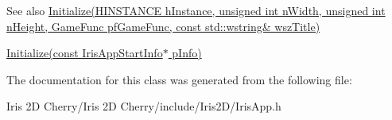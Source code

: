 \begin{DoxySeeAlso}{See also}
\hyperlink{class_iris2_d_1_1_iris_application_a84f3ddebb3a3ffb0c172bd41fb952e1a}{Initialize(\+H\+I\+N\+S\+T\+A\+N\+C\+E h\+Instance, unsigned int n\+Width, unsigned int n\+Height, Game\+Func pf\+Game\+Func, const std\+::wstring\& wsz\+Title)} 

\hyperlink{class_iris2_d_1_1_iris_application_ac20656815694f980fccfc4369727a9a9}{Initialize(const Iris\+App\+Start\+Info$\ast$ p\+Info)} 
\end{DoxySeeAlso}


The documentation for this class was generated from the following file\+:\begin{DoxyCompactItemize}
\item 
Iris 2\+D Cherry/\+Iris 2\+D Cherry/include/\+Iris2\+D/Iris\+App.\+h\end{DoxyCompactItemize}
